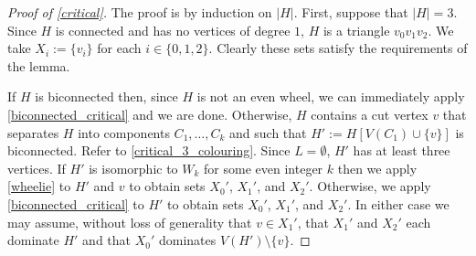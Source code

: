 \documentclass[a4paper,UKenglish,cleveref, autoref, thm-restate]{lipics-v2021}
\begin{document}
\begin{proof}[Proof of \cref{critical}]
  The proof is by induction on $|H|$.  First, suppose that $|H|=3$. Since $H$ is connected and has no vertices of degree $1$, $H$ is a triangle $v_0v_1v_2$. We take $X_i:=\{v_i\}$ for each $i\in\{0,1,2\}$.  Clearly these sets satisfy the requirements of the lemma.

  If $H$ is biconnected then, since $H$ is not an even wheel, we can immediately apply \cref{biconnected_critical} and we are done.  Otherwise, $H$ contains a cut vertex $v$ that separates $H$ into components $C_1,\ldots,C_k$ and such that $H':=H[V(C_1)\cup\{v\}]$ is biconnected. Refer to \cref{critical_3_colouring}. Since $L=\emptyset$, $H'$ has at least three vertices. If $H'$ is isomorphic to $W_k$ for some even integer $k$ then we apply \cref{wheelie} to $H'$ and $v$ to obtain sets $X_0'$, $X_1'$, and $X_2'$. Otherwise, we apply \cref{biconnected_critical} to $H'$ to obtain sets $X_0'$, $X_1'$, and $X_2'$.  In either case we may assume, without loss of generality that $v\in X_1'$, that $X_1'$ and $X_2'$ each dominate $H'$ and that $X_0'$ dominates $V(H')\setminus\{v\}$.


\end{proof}
\end{document}
